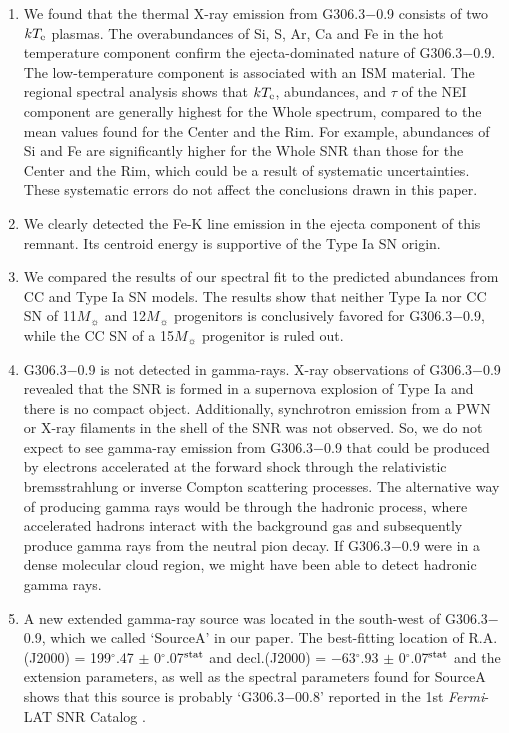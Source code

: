 \documentclass[useAMS,usenatbib]{mn2e}
\begin{document}
\begin{enumerate}
\item We found that the thermal X-ray emission from G306.3$-$0.9 consists of two $kT_{\rm e}$ plasmas. The overabundances of Si, S, Ar, Ca and Fe in the hot temperature component confirm the ejecta-dominated nature of G306.3$-$0.9. The low-temperature component is associated with an ISM material. The regional spectral analysis shows that $kT_{\rm e}$, abundances, and $\tau$ of the NEI component are generally highest for the Whole spectrum, compared to the mean values found for the Center and the Rim. For example, abundances of Si and Fe are significantly higher for the Whole SNR than those for the Center and the Rim, which could be a result of systematic uncertainties. These systematic errors do not affect the conclusions drawn in this paper.


\item We clearly detected the Fe-K line emission in the ejecta component of this remnant. Its centroid energy is supportive of the Type Ia SN origin.

\item We compared the results of our spectral fit to the predicted abundances from CC \citep {Wo95} and Type Ia SN \citep {No97,Ba03} models. 
The results show that neither Type Ia nor CC SN of 11$M_{\sun}$ and 12$M_{\sun}$ progenitors is conclusively favored for G306.3$-$0.9, while the CC SN of a 15$M_{\sun}$ progenitor is ruled out.

\item G306.3$-$0.9 is not detected in gamma-rays. X-ray observations of G306.3$-$0.9 revealed that the SNR is formed in a supernova explosion of Type Ia and there is no compact object. Additionally, synchrotron emission from a PWN or X-ray filaments in the shell of the SNR was not observed. So, we do not expect to see gamma-ray emission from G306.3$-$0.9 that could be produced by electrons accelerated at the forward shock through the relativistic bremsstrahlung or inverse Compton scattering processes. The alternative way of producing gamma rays would be through the hadronic process, where accelerated hadrons interact with the background gas and subsequently produce gamma rays from the neutral pion decay. If G306.3$-$0.9 were in a dense molecular cloud region, we might have been able to detect hadronic gamma rays.

\item A new extended gamma-ray source was located in the south-west of G306.3$-$0.9, which we called `SourceA' in our paper. The best-fitting location of R.A.(J2000) = 199$^{\circ}\!\!$.47 $\pm$ 0$^{\circ}\!\!$.07$^{\rm stat}$ and decl.(J2000) = $-$63$^{\circ}\!\!$.93 $\pm$ 0$^{\circ}\!\!$.07$^{\rm stat}$ and the extension parameters, as well as the spectral parameters found for SourceA shows that this source is probably `G306.3$-$00.8' reported in the 1st {\it Fermi}-LAT SNR Catalog \citep{Ac16}. 


\end{enumerate}
\end{document}
